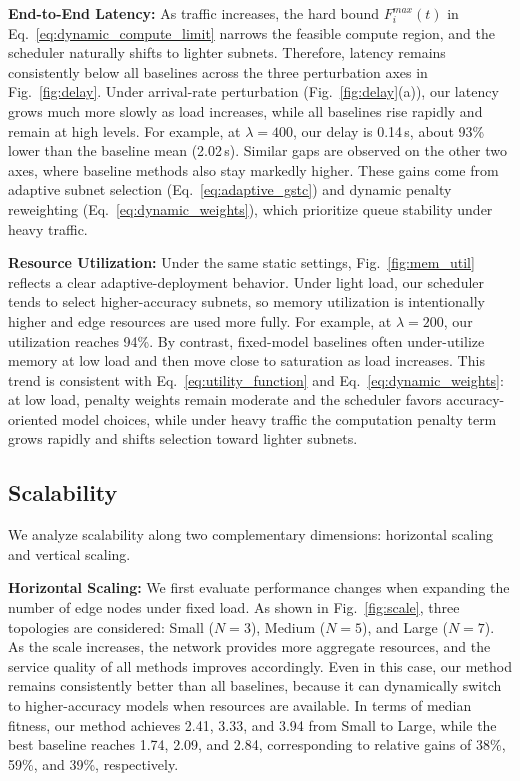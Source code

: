 \documentclass[conference]{IEEEtran}
\begin{document}
\textbf{End-to-End Latency:} As traffic increases, the hard bound $F_i^{max}(t)$ in Eq.~\eqref{eq:dynamic_compute_limit} narrows the feasible compute region, and the scheduler naturally shifts to lighter subnets. Therefore, latency remains consistently below all baselines across the three perturbation axes in Fig.~\ref{fig:delay}. Under arrival-rate perturbation (Fig.~\ref{fig:delay}(a)), our latency grows much more slowly as load increases, while all baselines rise rapidly and remain at high levels. For example, at $\lambda=400$, our delay is 0.14\,s, about 93\% lower than the baseline mean (2.02\,s). Similar gaps are observed on the other two axes, where baseline methods also stay markedly higher. These gains come from adaptive subnet selection (Eq.~\eqref{eq:adaptive_gstc}) and dynamic penalty reweighting (Eq.~\eqref{eq:dynamic_weights}), which prioritize queue stability under heavy traffic.

\textbf{Resource Utilization:} Under the same static settings, Fig.~\ref{fig:mem_util} reflects a clear adaptive-deployment behavior. Under light load, our scheduler tends to select higher-accuracy subnets, so memory utilization is intentionally higher and edge resources are used more fully. For example, at $\lambda=200$, our utilization reaches 94\%. By contrast, fixed-model baselines often under-utilize memory at low load and then move close to saturation as load increases. This trend is consistent with Eq.~\eqref{eq:utility_function} and Eq.~\eqref{eq:dynamic_weights}: at low load, penalty weights remain moderate and the scheduler favors accuracy-oriented model choices, while under heavy traffic the computation penalty term grows rapidly and shifts selection toward lighter subnets.

\subsection{Scalability}

We analyze scalability along two complementary dimensions: horizontal scaling and vertical scaling.

\textbf{Horizontal Scaling:} We first evaluate performance changes when expanding the number of edge nodes under fixed load. As shown in Fig.~\ref{fig:scale}, three topologies are considered: Small ($N=3$), Medium ($N=5$), and Large ($N=7$). As the scale increases, the network provides more aggregate resources, and the service quality of all methods improves accordingly. Even in this case, our method remains consistently better than all baselines, because it can dynamically switch to higher-accuracy models when resources are available. In terms of median fitness, our method achieves 2.41, 3.33, and 3.94 from Small to Large, while the best baseline reaches 1.74, 2.09, and 2.84, corresponding to relative gains of 38\%, 59\%, and 39\%, respectively.
\end{document}
